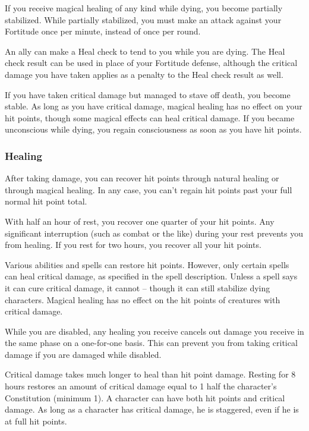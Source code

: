             If you receive magical healing of any kind while dying, you become partially stabilized.
            While partially stabilized, you must make an attack against your Fortitude once per minute, instead of once per round.

            An ally can make a Heal check to tend to you while you are dying.
            The Heal check result can be used in place of your Fortitude defense, although the critical damage you have taken applies as a penalty to the Heal check result as well.

            \label{Stable}
            If you have taken critical damage but managed to stave off death, you become stable.
            As long as you have critical damage, magical healing has no effect on your hit points, though some magical effects can heal critical damage.
            If you became unconscious while dying, you regain consciousness as soon as you have hit points.

        \subsubsection{Healing}
            After taking damage, you can recover hit points through natural healing or through magical healing.
            In any case, you can't regain hit points past your full normal hit point total.

             With half an hour of rest, you recover one quarter of your hit points.
            Any significant interruption (such as combat or the like) during your rest prevents you from healing.
            If you rest for two hours, you recover all your hit points.

             Various abilities and spells can restore hit points.
            However, only certain spells can heal critical damage, as specified in the spell description.
            Unless a spell says it can cure critical damage, it cannot -- though it can still stabilize dying characters.
            Magical healing has no effect on the hit points of creatures with critical damage.

             While you are disabled, any healing you receive cancels out damage you receive in the same phase on a one-for-one basis.
            This can prevent you from taking critical damage if you are damaged while disabled.

             Critical damage takes much longer to heal than hit point damage.
            Resting for 8 hours restores an amount of critical damage equal to 1 \add half the character's Constitution (minimum 1).
            A character can have both hit points and critical damage.
            As long as a character has critical damage, he is staggered, even if he is at full hit points.


